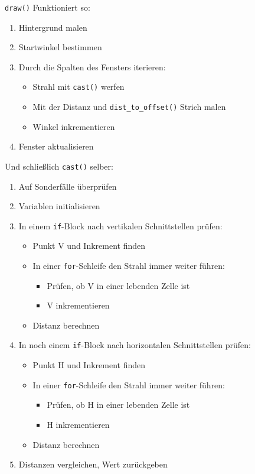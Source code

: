 \documentclass[a4paper,12pt]{report}
\begin{document}
\texttt{draw()} Funktioniert so:
\begin{spacing}{1.0}
\begin{framed}
\begin{enumerate}
	\item Hintergrund malen
	\item Startwinkel bestimmen
	\item Durch die Spalten des Fensters iterieren:
	\begin{itemize}
		\item Strahl mit \texttt{cast()} werfen
		\item Mit der Distanz und \texttt{dist\_to\_offset()} Strich malen
		\item Winkel inkrementieren
	\end{itemize}
	\item Fenster aktualisieren
\end{enumerate}
\end{framed}
\end{spacing}

Und schließlich \texttt{cast()} selber:
\begin{spacing}{1.0}
\begin{framed}
\begin{enumerate}
	\item Auf Sonderfälle überprüfen
	\item Variablen initialisieren
	\item In einem \texttt{if}-Block nach vertikalen Schnittstellen prüfen:
	\begin{itemize}
		\item Punkt V und Inkrement finden
		\item In einer \texttt{for}-Schleife den Strahl immer weiter führen:
		\begin{itemize}
			\item Prüfen, ob V in einer lebenden Zelle ist
			\item V inkrementieren
		\end{itemize}
		\item Distanz berechnen
	\end{itemize}
	\item In noch einem \texttt{if}-Block nach horizontalen Schnittstellen prüfen:
	\begin{itemize}
		\item Punkt H und Inkrement finden
		\item In einer \texttt{for}-Schleife den Strahl immer weiter führen:
		\begin{itemize}
			\item Prüfen, ob H in einer lebenden Zelle ist
			\item H inkrementieren
		\end{itemize}
		\item Distanz berechnen
	\end{itemize}
	\item Distanzen vergleichen, Wert zurückgeben
\end{enumerate}
\end{framed}
\end{spacing}
\end{document}
